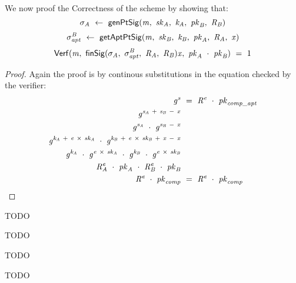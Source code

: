 We now proof the Correctness of the scheme by showing that:~
\[ \sigma_{\mathit{A}} ~\leftarrow~ \mathsf{genPtSig}(\mathit{m} ,~ \mathit{sk}_{\mathit{A}} ,~ \mathit{\mathit{k}_{\mathit{A}}} ,~ \mathit{pk}_{\mathit{B}} ,~ \mathit{R}_{\mathit{B}}) \]
\[ \sigma^{\mathit{B}}_{\mathit{apt}} ~\leftarrow~ \mathsf{getAptPtSig}(\mathit{m} ,~ \mathit{sk}_{\mathit{B}} ,~ \mathit{\mathit{k}_{\mathit{B}}} ,~ \mathit{pk}_{\mathit{A}} ,~ \mathit{R}_{\mathit{A}} ,~ \mathit{x}) \]
\[ \mathsf{Verf}(\mathit{m} ,~ \mathsf{finSig}(\sigma_{\mathit{A}} ,~ \sigma^{\mathit{B}}_{\mathit{apt}} ,~ \mathit{R}_{\mathit{A}} ,~ \mathit{R}_{\mathit{B}}){\mathit{x}} ,~ \mathit{pk}_{\mathit{A}} ~\cdot~ \mathit{pk}_{\mathit{B}}) ~=~ 1 \]

\begin{proof}
    \label{prf:aptSchnorr}
    Again the proof is by continous substitutions in the equation checked by the verifier:
    \begin{align}
        \mathit{g}^{\mathit{s}} &~=~ \mathit{R}^{\mathit{e}} ~\cdot~ \mathit{pk}_{\mathit{comp\_apt}} \\
        \mathit{g}^{\mathit{s}_{\mathit{A}} ~+~ \mathit{s}_{\mathit{B}} ~-~ \mathit{x}} & \\
        \mathit{g}^{\mathit{s}_{\mathit{A}}} ~\cdot~ \mathit{g}^{\mathit{s}_{\mathit{B}} ~-~ \mathit{x}} & \\
        \mathit{g}^{\mathit{\mathit{k}_{\mathit{A}}} ~+~ \mathit{e} ~\times~ \mathit{sk}_{\mathit{A}}} ~\cdot~ \mathit{g}^{\mathit{\mathit{k}_{\mathit{B}}} ~+~ \mathit{e} ~\times~ \mathit{sk}_{\mathit{B}} ~+~ \mathit{x} ~-~ \mathit{x}} & \\
        \mathit{g}^{\mathit{\mathit{k}_{\mathit{A}}}} ~\cdot~ \mathit{g}^{\mathit{e} ~\times~ \mathit{sk}_{\mathit{A}}} ~\cdot~ \mathit{g}^{\mathit{\mathit{k}_{\mathit{B}}}} ~\cdot~ \mathit{g}^{\mathit{e} ~\times~ \mathit{sk}_{\mathit{B}}} & \\
        \mathit{R}_{\mathit{A}}^{\mathit{e}} ~\cdot~ \mathit{pk}_{\mathit{A}} ~\cdot~ \mathit{R}_{\mathit{B}}^{\mathit{e}} ~\cdot~ \mathit{pk}_{\mathit{B}} & \\
        \mathit{R}^{\mathit{e}} ~\cdot~ \mathit{pk}_{\mathit{comp}} & ~=~ \mathit{R}^{\mathit{e}} ~\cdot~ \mathit{pk}_{\mathit{comp}}
    \end{align}
\end{proof}

\begin{definition}
    TODO~\cite{aumayr2020bitcoinchannels}
\end{definition}

\begin{definition}
    TODO~\cite{aumayr2020bitcoinchannels}
\end{definition}

\begin{definition}
    TODO~\cite{aumayr2020bitcoinchannels}
\end{definition}

\begin{definition}
    TODO~\cite{aumayr2020bitcoinchannels}
\end{definition}